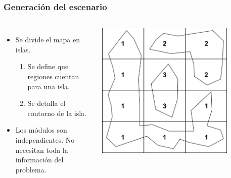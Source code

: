 \begin{frame}
	\frametitle{Generación del escenario}
	
	\begin{columns}
		\begin{itemize}
			\item<1-> Se divide el mapa en \textcolor{UDCpink}{islas}.
			\vspace{0.5em}
			
			\begin{enumerate}
				\item<2-> Se define que regiones cuentan para una isla.
				\vspace{0.5em}
				\item<3-> Se detalla el contorno de la isla.
			\end{enumerate}
		
			\vspace{0.5em}
			\item<4-> Los módulos son \textcolor{UDCpink}{independientes}. No necesitan toda la información del problema.
		\end{itemize}
		
		\centering
		\includegraphics[width=0.8\textwidth]{images/regiones.png}
	\end{columns}
\end{frame}

